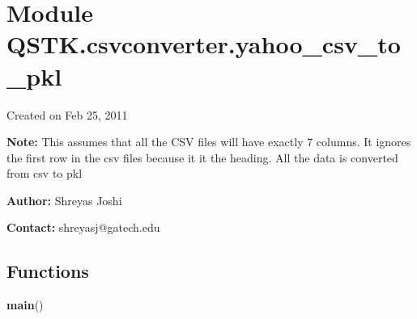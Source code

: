 %
%
%


\section{Module QSTK.csvconverter.yahoo\_csv\_to\_pkl}

    \label{QSTK:csvconverter:yahoo_csv_to_pkl}
Created on Feb 25, 2011

\textbf{Note:} This assumes that all the CSV files will have exactly 7 columns. It ignores
the first row in the csv files because it it the heading. All the data is 
converted from csv to pkl



\textbf{Author:} Shreyas Joshi



\textbf{Contact:} shreyasj@gatech.edu





  \subsection{Functions}

    \label{QSTK:csvconverter:yahoo_csv_to_pkl:main}

    \vspace{0.5ex}

\hspace{.8\funcindent}\begin{boxedminipage}{\funcwidth}

    \raggedright \textbf{main}()

\setlength{\parskip}{2ex}
\setlength{\parskip}{1ex}
    \end{boxedminipage}


